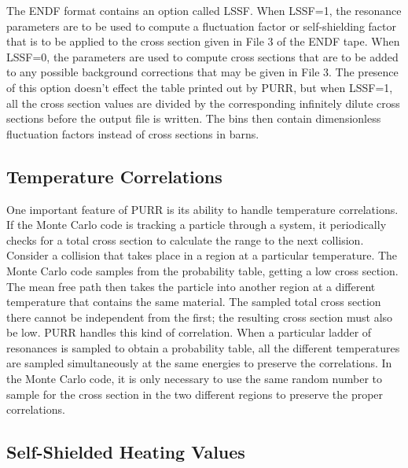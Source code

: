 The ENDF format contains an option called LSSF.  When LSSF=1, the
resonance parameters are to be used to compute a fluctuation factor
or self-shielding factor that is to be applied to the cross section
given in File 3 of the ENDF tape.  When LSSF=0, the parameters are
used to compute cross sections that are to be added to any possible
background corrections that may be given in File 3.  The presence of
this option doesn't effect the table printed out by PURR, but when
LSSF=1, all the cross section values are divided by the corresponding
infinitely dilute cross sections before the output file is written.
The bins then contain dimensionless fluctuation factors instead of
cross sections in barns.

\subsection{Temperature Correlations}
\label{ssPURR_temp}

One important feature of PURR is its ability to handle temperature
correlations.  If the Monte Carlo
code is tracking a particle through a system, it periodically checks
for a total cross section to calculate the range to the next
collision.  Consider a collision that takes place in a region
at a particular temperature.   The Monte Carlo code samples
from the probability table, getting a low cross section.  The
mean free path then takes the particle into another region
at a different temperature that contains the same material.
The sampled total cross section there cannot be independent from the
first; the resulting cross section must also be low.  PURR handles
this kind of correlation.  When a particular ladder of resonances
is sampled to obtain a probability table, all the different
temperatures are sampled simultaneously at the same energies to
preserve the correlations.  In the Monte Carlo code, it is only
necessary to use the same random number to sample for the cross section
in the two different regions to preserve the proper correlations.


\subsection{Self-Shielded Heating Values}
\label{ssPURR_self}

